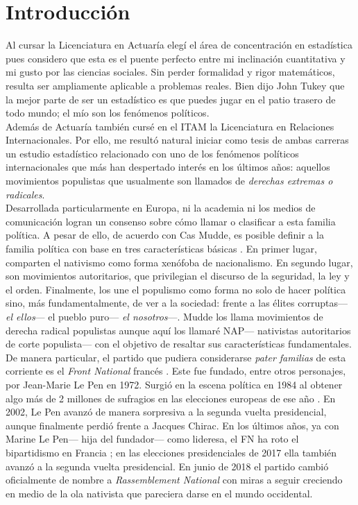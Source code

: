 \chapter*{Introducción}

Al cursar la Licenciatura en Actuaría elegí el área de concentración en estadística pues considero que esta es el puente perfecto entre mi inclinación cuantitativa y mi gusto por las ciencias sociales. Sin perder formalidad y rigor matemáticos, resulta ser ampliamente aplicable a problemas reales. Bien dijo John Tukey que la mejor parte de ser un estadístico es que puedes jugar en el patio trasero de todo mundo; el mío son los fenómenos políticos.\\

Además de Actuaría también cursé en el ITAM la Licenciatura en Relaciones Internacionales. Por ello, me resultó natural iniciar como tesis de ambas carreras un estudio estadístico relacionado con uno de los fenómenos políticos internacionales que más han despertado interés en los últimos años: aquellos movimientos populistas que usualmente son llamados de \textit{derechas extremas o radicales}.\\ 

Desarrollada particularmente en Europa, ni la academia ni los medios de comunicación logran un consenso sobre cómo llamar o clasificar a esta familia política. A pesar de ello, de acuerdo con Cas Mudde, es posible definir a la familia política con base en tres características básicas \parencites{Mudde07a}{Beauchamp16a}. En primer lugar, comparten el nativismo como forma xenófoba de nacionalismo. En segundo lugar, son movimientos autoritarios, que privilegian el discurso de la seguridad, la ley y el orden. Finalmente, los une el populismo como forma no solo de hacer política sino, más fundamentalmente, de ver a la sociedad: frente a las élites corruptas--- \textit{el ellos}--- el pueblo puro--- \textit{el nosotros}---. Mudde los llama movimientos de derecha radical populistas aunque aquí los llamaré NAP--- nativistas autoritarios de corte populista--- con el objetivo de resaltar sus características fundamentales.\\

De manera particular, el partido que pudiera considerarse \textit{pater familias} de esta corriente es el \textit{Front National} francés \parencite{Mudde07a}. Este fue fundado, entre otros personajes, por Jean-Marie Le Pen en 1972. Surgió en la escena política en 1984 al obtener algo más de 2 millones de sufragios en las elecciones europeas de ese año \parencite{LeBras15}. En 2002, Le Pen avanzó de manera sorpresiva a la segunda vuelta presidencial, aunque finalmente perdió frente a Jacques Chirac. En los últimos años, ya con Marine Le Pen--- hija del fundador--- como lideresa, el FN ha roto el bipartidismo en Francia \parencite{LeBras16};  en las elecciones presidenciales de 2017 ella también avanzó a la segunda vuelta presidencial. En junio de 2018 el partido cambió oficialmente de nombre a \textit{Rassemblement National} con miras a seguir creciendo en medio de la ola nativista que pareciera darse en el mundo occidental.\\

